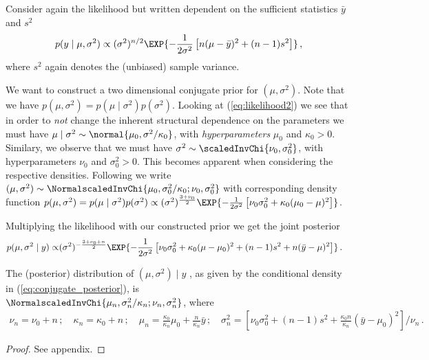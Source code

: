 Consider again the likelihood but written dependent on the sufficient statistics $\bar{y}$ and $s^2$
\begin{align}
  p(y \mid \mu, \sigma^2) \propto (\sigma^2)^{n/2} \EXP{-\frac{1}{2\sigma^2} \left[ n(\mu - \bar{y})^2 + (n-1)s^2 \right]} \,,
  \label{eq:likelihood2}
\end{align}
where $s^2$ again denotes the (unbiased) sample variance.

We want to construct a two dimensional conjugate prior for $(\mu, \sigma^2)$.
Note that we have $p(\mu, \sigma^2) = p(\mu \mid \sigma^2) p(\sigma^2)$.
Looking at (\ref{eq:likelihood2}) we see that in order to \emph{not} change the inherent structural dependence on the parameters we must have $\mu \mid \sigma^2 \sim \normal{\mu_0, \sigma^2 / \kappa_0}$, with \emph{hyperparameters} $\mu_0$ and $\kappa_0 > 0$.
Similary, we observe that we must have $\sigma^2 \sim \scaledInvChi{\nu_0, \sigma_0^2}$, with hyperparameters $\nu_0$ and $\sigma_0^2 > 0$.
This becomes apparent when considering the respective densities.
Following \citet{gelmanbda04} we write $(\mu, \sigma^2) \sim \NormalscaledInvChi{\mu_0, \sigma_0^2 / \kappa_0; \nu_0, \sigma_0^2}$ with corresponding density function $p(\mu, \sigma^2) = p(\mu \mid \sigma^2) p(\sigma^2) \propto (\sigma^2)^{\frac{3 + \nu_0}{2}} \EXP{-\frac{1}{2\sigma^2} \left[\nu_0 \sigma_0^2 + \kappa_0(\mu_0 - \mu)^2 \right]}$.

Multiplying the likelihood with our constructed prior we get the joint posterior
\begin{align}
  p(\mu, \sigma^2 \mid y) \propto& (\sigma^2)^{-\frac{3 + \nu_0 + n}{2}} \EXP{-\frac{1}{2 \sigma^2} \left[\nu_0\sigma_0^2 + \kappa_0(\mu - \mu_0)^2 + (n-1)s^2 + n(\bar{y} - \mu)^2 \right]} \,.
  \label{eq:conjugate_posterior}
\end{align}

\begin{proposition}
  The (posterior) distribution of $(\mu, \sigma^2) \mid y$ , as given by the conditional density in (\ref{eq:conjugate_posterior}), is\\ $\NormalscaledInvChi{\mu_n, \sigma_n^2/\kappa_n; \nu_n, \sigma_n^2}$, where
  \begin{align*}
    \nu_n = \nu_0 + n \,; \quad \kappa_n = \kappa_0 + n \,; \quad \mu_n =\frac{\kappa_0}{\kappa_n}\mu_0 + \frac{n}{\kappa_n}\bar{y} \,; \quad \sigma_n^2 = \left[\nu_0 \sigma_0^2 + (n-1)s^2 + \frac{\kappa_0 n}{\kappa_n} (\bar{y} - \mu_0)^2\right] /\nu_n \,.
  \end{align*}
  \label{prop:posterior_conjugate}
\end{proposition}
\begin{proof}
  See appendix.
\end{proof}

